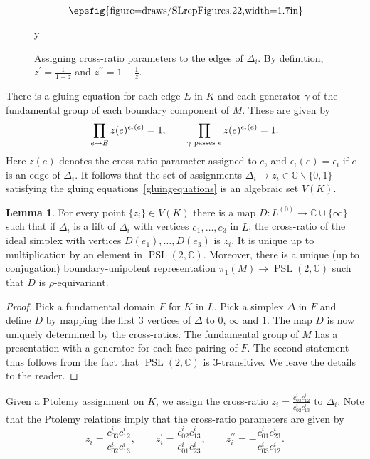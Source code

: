 \documentclass[11pt]{amsart}
\theoremstyle{definition}
\newtheorem{lemma}[theorem]{Lemma}
\numberwithin{equation}{section}
\def\printname#1{
        \if\draft y
                \smash{\makebox[0pt]{\hspace{-0.5in}
                        \raisebox{8pt}{\tt\tiny #1}}}
        \fi
}
\newcommand{\psdraw}[2]
         {\begin{array}{c} \hspace{-1.3mm}
        \raisebox{-4pt}{\epsfig{figure=draws/#1,width=#2}}
        \hspace{-1.9mm}\end{array}}
\def\lbl#1{\label{#1}\printname{#1}}
\DeclareMathOperator{\PSL}{PSL}
\newcommand{\C}{\mathbb C}
\newcommand{\Cinfty}{\C\cup\{\infty\}}
\newcommand{\Cremove}{\C\backslash\{0,1\}}
\begin{document}
\begin{figure}[ht]
$$
\psdraw{SLrepFigures.22}{1.7in}
$$
\caption{Assigning cross-ratio parameters to the edges of $\Delta_i$. By definition, $z^\prime=\frac{1}{1-z}$ and $z^{\prime\prime}=1-\frac{1}{z}$.}
\lbl{Crossratioparameters}
\end{figure}
There is a gluing equation for each edge $E$ in $K$ and each generator 
$\gamma$ of the fundamental group of each boundary component of $M$. These 
are given by
\begin{equation}\lbl{gluingequations}
\prod_{e\mapsto E}z(e)^{\epsilon_i(e)}=1,\qquad \prod_{\gamma\textnormal{ passes }e}
z(e)^{\epsilon_i(e)}=1.
\end{equation}
Here $z(e)$ denotes the cross-ratio parameter assigned to $e$, and 
$\epsilon_i(e)=\epsilon_i$ if $e$ is an edge of $\Delta_i$. 
It follows that the set of assignments $\Delta_i\mapsto z_i\in\Cremove$ 
satisfying the gluing equations~\eqref{gluingequations} is an algebraic 
set $V(K)$.
 
\begin{lemma} 
For every point $\{z_i\}\in V(K)$ there is a map $D\colon L^{(0)}\to\Cinfty$ 
such that if $\widetilde\Delta_i$ is a lift of $\Delta_i$ with vertices 
$e_1,\dots,e_3$ in $L$, the cross-ratio of the ideal simplex with vertices 
$D(e_1),\dots,D(e_3)$ is $z_i$. It is unique up to multiplication by an 
element in $\PSL(2,\C)$. Moreover, there is a unique (up to conjugation) 
boundary-unipotent representation $\pi_1(M)\to\PSL(2,\C)$ such that $D$ is 
$\rho$-equivariant.
\end{lemma}

\begin{proof}
Pick a fundamental domain $F$ for $K$ in $L$. Pick a simplex $\Delta$ in 
$F$ and define $D$ by mapping the first $3$ vertices of $\Delta$ to $0$, 
$\infty$ and $1$. The map $D$ is now uniquely determined by the cross-ratios. 
The fundamental group of $M$ has a presentation with a generator for each 
face pairing of $F$. The second statement thus follows from the fact that 
$\PSL(2,\C)$ is $3$-transitive. We leave the details to the reader.
\end{proof}

Given a Ptolemy assignment on $K$, we assign the cross-ratio $z_i=\frac{c^i_{03}c^i_{12}}{c^i_{02}c^i_{13}}$ to $\Delta_i$.
Note that the Ptolemy relations imply that the cross-ratio parameters are given by
\begin{equation}\label{eq:shapeparameterformula}
z_i=\frac{c^i_{03}c^i_{12}}{c^i_{02}c^i_{13}},\qquad z_i^\prime=\frac{c^i_{02}c^i_{13}}{c^i_{01}c^i_{23}}, \qquad z_i^{\prime\prime}=-\frac{c^i_{01}c^i_{23}}{c^i_{03}c^i_{12}}. 
\end{equation}
\end{document}
